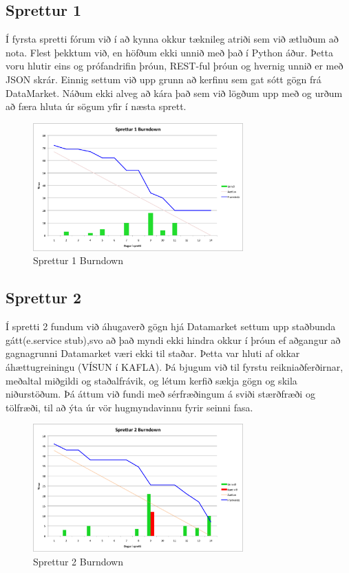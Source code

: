 \documentclass{article}
\begin{document}
\subsection{Sprettur 1}
Í fyrsta spretti fórum við í að kynna okkur tæknileg atriði sem við ætluðum að nota.
Flest þekktum við, en höfðum ekki unnið með það í Python áður. Þetta voru hlutir eins og prófandrifin þróun, REST-ful þróun og hvernig 
unnið er með JSON skrár. Einnig settum við upp grunn að kerfinu sem gat sótt gögn frá DataMarket. Náðum ekki alveg að kára það sem við lögðum 
upp með og urðum að færa hluta úr sögum yfir í næsta sprett.
\begin{figure}[H]
  \centering
  \includegraphics[width=0.72\textwidth]{Sprettur1_Burndown.png}
  \caption{Sprettur 1 Burndown}
\end{figure}

\subsection{Sprettur 2}
Í spretti 2 fundum við áhugaverð gögn hjá Datamarket settum upp staðbunda gátt(e.service stub),svo að það myndi ekki hindra okkur í þróun ef 
aðgangur að gagnagrunni Datamarket væri ekki til staðar. Þetta var hluti af okkar áhættugreiningu (VÍSUN í KAFLA). 
Þá bjugum við til fyrstu reikniaðferðirnar, meðaltal miðgildi og staðalfrávik, og létum kerfið sækja gögn og skila niðurstöðum.
Þá áttum við fundi með sérfræðingum á sviði stærðfræði og tölfræði, til að ýta úr vör hugmyndavinnu fyrir seinni fasa.
\begin{figure}[H]
 \centering
 \includegraphics[width=0.72\textwidth]{Sprettur2_Burndown.png}
 \caption{Sprettur 2 Burndown}
\end{figure}
\end{document}
